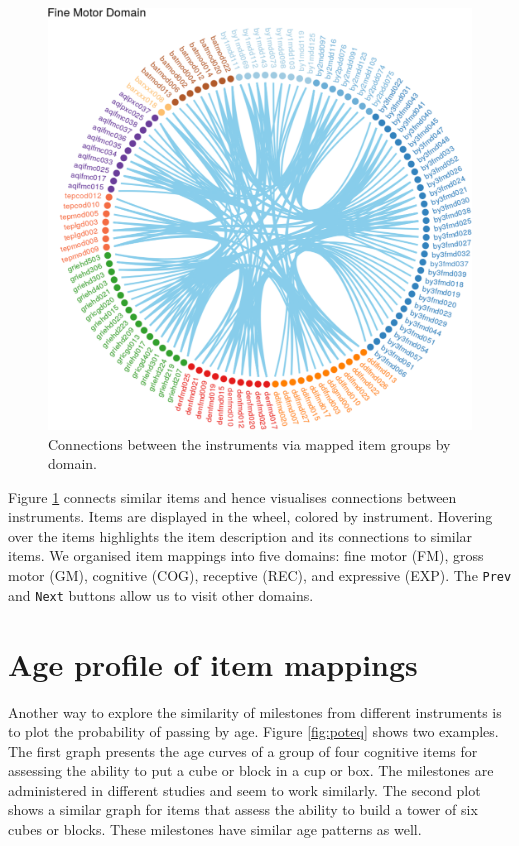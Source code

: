 \documentclass[
]{book}
\begin{document}
\begin{figure}

{\centering \includegraphics[width=1\linewidth]{fig/ring} 

}

\caption{Connections between the instruments via mapped item groups by domain.}\label{fig:mappingshiny}
\end{figure}



Figure \ref{fig:mappingshiny} connects similar items and hence visualises connections between instruments. Items are displayed in the wheel, colored by instrument. Hovering over the items highlights the item description and its connections to similar items. We organised item mappings into five domains: fine motor (FM), gross motor (GM), cognitive (COG), receptive (REC), and expressive (EXP). The \texttt{Prev} and \texttt{Next} buttons allow us to visit other domains.

\hypertarget{sec:viewmapping}{%
\section{Age profile of item mappings}\label{sec:viewmapping}}

Another way to explore the similarity of milestones from different instruments is to plot the probability of passing by age. Figure \ref{fig:poteq} shows two examples. The first graph presents the age curves of a group of four cognitive items for assessing the ability to put a cube or block in a cup or box. The milestones are administered in different studies and seem to work similarly. The second plot shows a similar graph for items that assess the ability to build a tower of six cubes or blocks. These milestones have similar age patterns as well.
\end{document}
